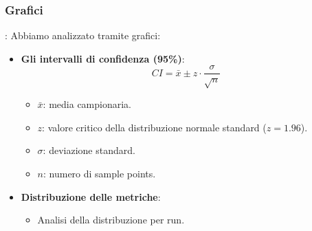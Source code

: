\subsubsection{Grafici}
\begin{frame}{\subsecname: \subsubsecname}
Abbiamo analizzato tramite grafici:
    \begin{itemize}
        \item \textbf{Gli intervalli di confidenza (95\%)}:
        \[
        CI = \bar{x} \pm z \cdot \frac{\sigma}{\sqrt{n}}
        \]
        \begin{itemize}
            \item $\bar{x}$: media campionaria.
            \item $z$: valore critico della distribuzione normale standard ($z = 1.96$).
            \item $\sigma$: deviazione standard.
            \item $n$: numero di sample points.
        \end{itemize}
        \item \textbf{Distribuzione delle metriche}:
        \begin{itemize}
            \item Analisi della distribuzione per run.
        \end{itemize}
    \end{itemize}
\end{frame}
